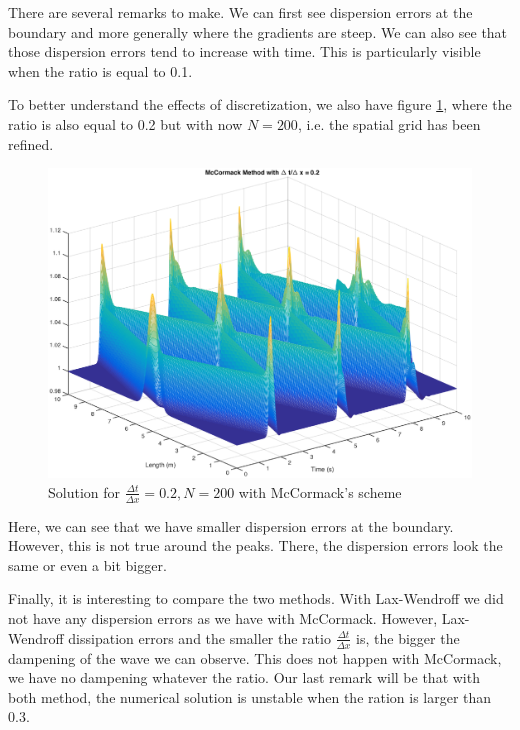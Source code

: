 There are several remarks to make. We can first see dispersion errors at the boundary and more generally where the gradients are steep. We can also see that those dispersion errors tend to increase with time. This is particularly visible when the ratio is equal to 0.1.

To better understand the effects of discretization, we also have figure \ref{mc200}, where the ratio is also equal to 0.2 but with now $N=200$, i.e. the spatial grid has been refined. 
\begin{figure}
\begin{center}
\includegraphics[scale=0.5]{mccormack02200.eps}
\caption{Solution for $\frac{\Delta t}{\Delta x}= 0.2, N=200$ with McCormack's scheme}
\label{mc200}
\end{center}
\end{figure}

Here, we can see that we have smaller dispersion errors at the boundary. However, this is not true around the peaks. There, the dispersion errors look the same or even a bit bigger.

Finally, it is interesting to compare the two methods. With Lax-Wendroff we did not have any dispersion errors as we have with McCormack. However, Lax-Wendroff dissipation errors and the smaller the ratio $\frac{\Delta t}{\Delta x}$ is, the bigger the dampening of the wave we can observe. This does not happen with McCormack, we have no dampening whatever the ratio. Our last remark will be that with both method, the numerical solution is unstable when the ration is larger than 0.3.

